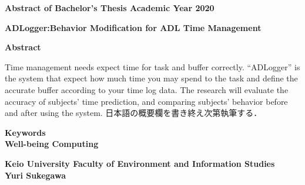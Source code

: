 \begin{center}
\textbf{\large Abstract of Bachelor's Thesis Academic Year 2020}

\vspace{6mm}

\textbf{\large ADLogger:Behavior Modification for ADL Time Management}
\end{center}

\vspace{10mm}


\begin{flushleft}
\textbf{Abstract}\\
\end{flushleft}

Time management needs expect time for task and buffer correctly. “ADLogger” is the system that expect how much time you may spend to the task and define the accurate buffer according to your time log data. The research will evaluate the accuracy of subjects’ time prediction, and comparing subjects’ behavior before and after using the system.
日本語の概要欄を書き終え次第執筆する．

\begin{flushleft}
\textbf{Keywords}\\
\textbf{Well-being Computing}
\end{flushleft}

\begin{flushright}
\textbf{Keio University Faculty of Environment and Information Studies}\\
\textbf{Yuri Sukegawa}\\
\end{flushright}